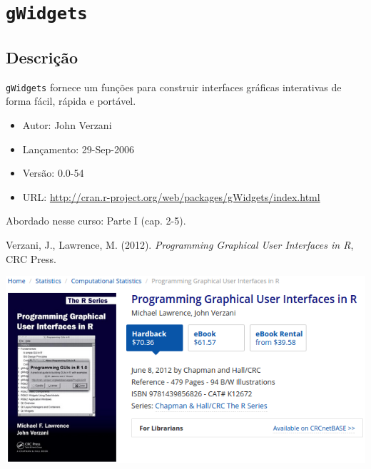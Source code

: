 \section{\texttt{gWidgets}}


\subsection{Descrição}

\begin{frame}

  \texttt{gWidgets} fornece um funções para construir interfaces
  gráficas interativas de forma fácil, rápida e portável.
  \vspace{2em}

  \begin{itemize}
  \item Autor: John Verzani
  \item Lançamento: 29-Sep-2006
  \item Versão: 0.0-54
  \item URL: \url{http://cran.r-project.org/web/packages/gWidgets/index.html}
  \end{itemize}

\end{frame}

\begin{frame}

  Abordado nesse curso: Parte I (cap. 2-5).
 \vspace{1ex}

  Verzani, J., Lawrence, M. (2012). \emph{Programming Graphical User
    Interfaces in R}, CRC Press.

  \begin{center}
    \includegraphics[width=0.8\linewidth]{./images/ProgGUI-2.png}
  \end{center}

\end{frame}

